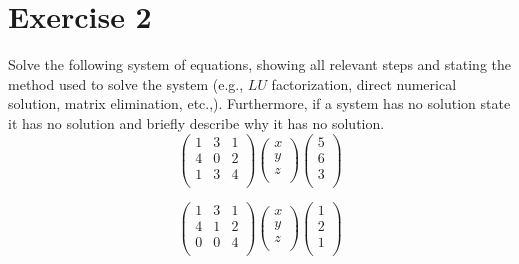 \documentclass[12pt]{article}
\begin{document}
\section{Exercise 2}
Solve the following system of equations, showing all relevant steps and
stating the method used to solve the system (e.g., $LU$ factorization,
direct numerical solution, matrix elimination, etc.,).  Furthermore, if a
system has no solution state it has no solution and briefly describe why it
has no solution. 
\begin{equation}
    \begin{pmatrix}
        1       &   3       &   1   \\
        4       &   0       &   2   \\
        1       &   3       &   4   \\
    \end{pmatrix}
    \begin{pmatrix}
        x       \\
        y       \\
        z       \\
    \end{pmatrix}
    \begin{pmatrix}
        5       \\
        6       \\
        3       \\
    \end{pmatrix}
\end{equation}

\begin{equation}
    \begin{pmatrix}
        1       &   3       &   1   \\
        4       &   1       &   2   \\
        0       &   0       &   4   \\
    \end{pmatrix}
    \begin{pmatrix}
        x       \\
        y       \\
        z       \\
    \end{pmatrix}
    \begin{pmatrix}
        1       \\
        2       \\
        1       \\
    \end{pmatrix}
\end{equation}
\end{document}
